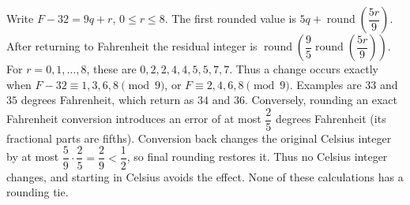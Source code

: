 Write $F-32=9q+r$, $0\le r\le8$. The first rounded value is $5q+\operatorname{round}(\dfrac{5r}{9})$. After returning to Fahrenheit the residual integer is $\operatorname{round}(\dfrac{9}{5}\operatorname{round}(\dfrac{5r}{9}))$. For $r=0,1,\ldots,8$, these are $0,2,2,4,4,5,5,7,7$. Thus a change occurs exactly when $F-32\equiv1,3,6,8\pmod9$, or $\boxed{F\equiv2,4,6,8\pmod9}$. Examples are $33$ and $35$ degrees Fahrenheit, which return as $34$ and $36$. Conversely, rounding an exact Fahrenheit conversion introduces an error of at most $\dfrac{2}{5}$ degrees Fahrenheit (its fractional parts are fifths). Conversion back changes the original Celsius integer by at most $\dfrac{5}{9}\cdot\dfrac{2}{5}=\dfrac{2}{9}<\dfrac{1}{2}$, so final rounding restores it. Thus no Celsius integer changes, and starting in Celsius avoids the effect. None of these calculations has a rounding tie.
